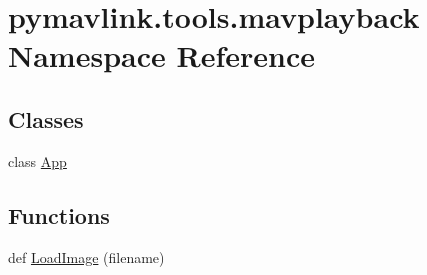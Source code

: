 \hypertarget{namespacepymavlink_1_1tools_1_1mavplayback}{}\section{pymavlink.\+tools.\+mavplayback Namespace Reference}
\label{namespacepymavlink_1_1tools_1_1mavplayback}
\subsection*{Classes}
\begin{DoxyCompactItemize}
\item 
class \hyperlink{classpymavlink_1_1tools_1_1mavplayback_1_1App}{App}
\end{DoxyCompactItemize}
\subsection*{Functions}
\begin{DoxyCompactItemize}
\item 
def \hyperlink{namespacepymavlink_1_1tools_1_1mavplayback_a17e3c701be8a8a9874ae66267994781f}{Load\+Image} (filename)
\end{DoxyCompactItemize}
